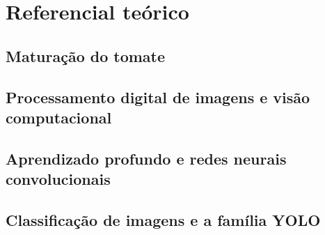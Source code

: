 \chapter{Referencial teórico}\label{cap:referencial}



\section{Maturação do tomate}\label{sec:maturacao}


\section{Processamento digital de imagens e visão computacional}


\section{Aprendizado profundo e redes neurais convolucionais}


\section{Classificação de imagens e a família YOLO}


